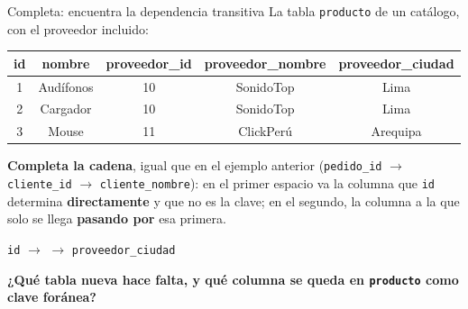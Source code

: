 \documentclass[aspectratio=169,10pt,c]{beamer}
\newcommand{\fdep}{$\rightarrow$}
\newcommand{\bl}[1][1.9cm]{\underline{\hspace{#1}}}
\newcommand{\tbl}[1]{\textcolor{utpNaranja}{\texttt{#1}}}
\begin{document}
\begin{frame}{Completa: encuentra la dependencia transitiva}
\small La tabla \tbl{producto} de un catálogo, con el proveedor incluido:
\vspace{0.2cm}
\begin{center}
\footnotesize\setlength\tabcolsep{5pt}
\begin{tabular}{ccccc}
\toprule
\bfseries id & \bfseries nombre & \bfseries proveedor\_id & \bfseries proveedor\_nombre & \bfseries proveedor\_ciudad \\
\midrule
1 & Audífonos & 10 & SonidoTop & Lima \\
2 & Cargador  & 10 & SonidoTop & Lima \\
3 & Mouse     & 11 & ClickPerú & Arequipa \\
\bottomrule
\end{tabular}
\end{center}
\vspace{0.3cm}
\small \textbf{Completa la cadena}, igual que en el ejemplo anterior (\texttt{pedido\_id} \fdep{} \texttt{cliente\_id} \fdep{} \texttt{cliente\_nombre}): en el primer espacio va la columna que \texttt{id} determina \textbf{directamente} y que no es la clave; en el segundo, la columna a la que solo se llega \textbf{pasando por} esa primera.
\vspace{0.15cm}
\begin{center}
\texttt{id} \fdep{} \bl[2.6cm] \fdep{} \texttt{proveedor\_ciudad}
\end{center}
\vspace{0.15cm}

\small \textbf{¿Qué tabla nueva hace falta, y qué columna se queda en \tbl{producto} como clave foránea?}\\
\bl[9cm]
\end{frame}
\end{document}

